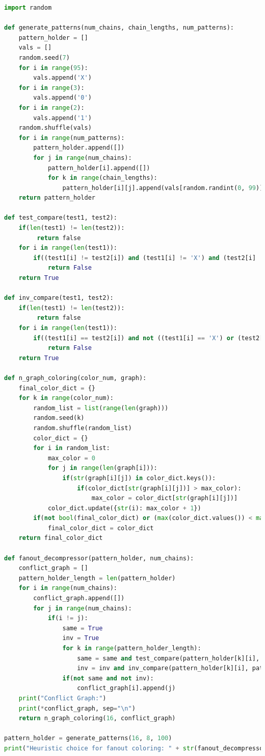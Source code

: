 \documentclass[letterpaper]{article} %
\begin{document}
\begin{lstlisting}[language=Python, caption=Python code used to generate test-patterns; produce the conflict graph; and color the graph]
import random

def generate_patterns(num_chains, chain_lengths, num_patterns):
    pattern_holder = []
    vals = []
    random.seed(7)
    for i in range(95):
        vals.append('X')
    for i in range(3):
        vals.append('0')
    for i in range(2):
        vals.append('1')
    random.shuffle(vals)
    for i in range(num_patterns):
        pattern_holder.append([])
        for j in range(num_chains):
            pattern_holder[i].append([])
            for k in range(chain_lengths):
                pattern_holder[i][j].append(vals[random.randint(0, 99)])
    return pattern_holder

def test_compare(test1, test2):
    if(len(test1) != len(test2)):
         return false
    for i in range(len(test1)):
        if((test1[i] != test2[i]) and (test1[i] != 'X') and (test2[i] != 'X')):
            return False
    return True

def inv_compare(test1, test2):
    if(len(test1) != len(test2)):
         return false
    for i in range(len(test1)):
        if((test1[i] == test2[i]) and not ((test1[i] == 'X') or (test2[i] == 'X'))):
            return False
    return True

def n_graph_coloring(color_num, graph):
    final_color_dict = {}
    for k in range(color_num):
        random_list = list(range(len(graph)))
        random.seed(k)
        random.shuffle(random_list)
        color_dict = {}
        for i in random_list:
            max_color = 0
            for j in range(len(graph[i])):
                if(str(graph[i][j]) in color_dict.keys()):
                    if(color_dict[str(graph[i][j])] > max_color):
                        max_color = color_dict[str(graph[i][j])]
            color_dict.update({str(i): max_color + 1})
        if(not bool(final_color_dict) or (max(color_dict.values()) < max(final_color_dict.values()))):
            final_color_dict = color_dict
    return final_color_dict

def fanout_decompressor(pattern_holder, num_chains):
    conflict_graph = []
    pattern_holder_length = len(pattern_holder)
    for i in range(num_chains):
        conflict_graph.append([])
        for j in range(num_chains):
            if(i != j):
                same = True
                inv = True
                for k in range(pattern_holder_length):
                    same = same and test_compare(pattern_holder[k][i], pattern_holder[k][j])
                    inv = inv and inv_compare(pattern_holder[k][i], pattern_holder[k][j])
                if(not same and not inv):
                    conflict_graph[i].append(j)
    print("Conflict Graph:")
    print(*conflict_graph, sep="\n")
    return n_graph_coloring(16, conflict_graph)

pattern_holder = generate_patterns(16, 8, 100)
print("Heuristic choice for fanout coloring: " + str(fanout_decompressor(pattern_holder, 16)))
\end{lstlisting} 
\end{document}
